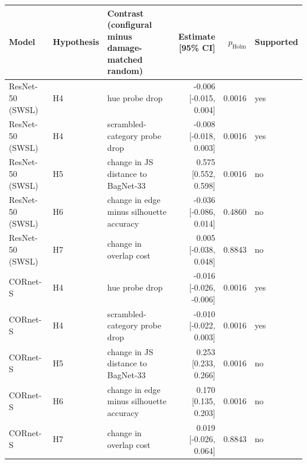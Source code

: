 \begin{tabular}{lllrrl}
\hline
Model & Hypothesis & Contrast (configural minus damage-matched random) & Estimate [95\% CI] & $p_\mathrm{Holm}$ & Supported \\
\hline
ResNet-50 (SWSL) & H4 & hue probe drop & -0.006 [-0.015, 0.004] & 0.0016 & yes \\
ResNet-50 (SWSL) & H4 & scrambled-category probe drop & -0.008 [-0.018, 0.003] & 0.0016 & yes \\
ResNet-50 (SWSL) & H5 & change in JS distance to BagNet-33 & 0.575 [0.552, 0.598] & 0.0016 & no \\
ResNet-50 (SWSL) & H6 & change in edge minus silhouette accuracy & -0.036 [-0.086, 0.014] & 0.4860 & no \\
ResNet-50 (SWSL) & H7 & change in overlap cost & 0.005 [-0.038, 0.048] & 0.8843 & no \\
CORnet-S & H4 & hue probe drop & -0.016 [-0.026, -0.006] & 0.0016 & yes \\
CORnet-S & H4 & scrambled-category probe drop & -0.010 [-0.022, 0.003] & 0.0016 & yes \\
CORnet-S & H5 & change in JS distance to BagNet-33 & 0.253 [0.233, 0.266] & 0.0016 & no \\
CORnet-S & H6 & change in edge minus silhouette accuracy & 0.170 [0.135, 0.203] & 0.0016 & no \\
CORnet-S & H7 & change in overlap cost & 0.019 [-0.026, 0.064] & 0.8843 & no \\
\hline
\end{tabular}